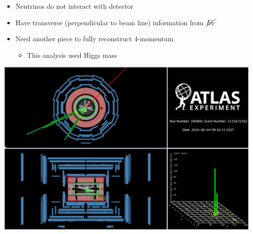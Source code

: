 \documentclass{beamer}
\newcommand*{\met}{\ensuremath{\cancel{E_{T}}}\xspace}
\newcommand*{\header}[1]{\fontsize{16}{8}\selectfont \textbf{{\color{MyPurple}{#1}}}}
\begin{document}
\begin{frame}
\begin{center}
\header{Neutrinos}
\end{center}
\begin{itemize}
\item Neutrinos do not interact with detector
\item Have transverse (perpendicular to beam line) information from \met
\item Need another piece to fully reconstruct 4-momentum
\begin{itemize}
\item This analysis used Higgs mass
\end{itemize}
\end{itemize}
\begin{center}
\includegraphics[height=0.5\textheight]{figures/met}
\end{center}
\end{frame}
\end{document}
